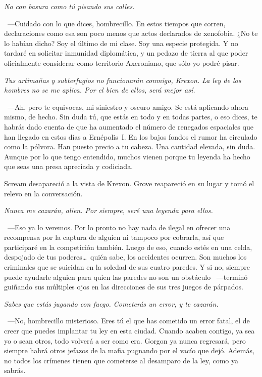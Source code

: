 \emph{No con basura como tú pisando sus calles.}

~---Cuidado con lo que dices, hombrecillo. En estos tiempos que corren, declaraciones como esa son poco menos que actos declarados de xenofobia. ¿No te lo habían dicho? Soy el último de mi clase. Soy una especie protegida. Y no tardaré en solicitar inmunidad diplomática, y un pedazo de tierra al que poder oficialmente considerar como territorio Axcroniano, que sólo yo podré pisar.

\emph{Tus artimañas y subterfugios no funcionarán conmigo, Krexon. La ley de los hombres no se me aplica. Por el bien de ellos, será mejor así.}

~---Ah, pero te equivocas, mi siniestro y oscuro amigo. Se está aplicando ahora mismo, de hecho. Sin duda tú, que estás en todo y en todas partes, o eso dices, te habrás dado cuenta de que ha aumentado el número de renegados espaciales que han llegado en estos días a Ernépolis~I. En los bajos fondos el rumor ha circulado como la pólvora. Han puesto precio a tu cabeza. Una cantidad elevada, sin duda. Aunque por lo que tengo entendido, muchos vienen porque tu leyenda ha hecho que seas una presa apreciada y codiciada.

Scream desapareció a la vista de Krexon. Grove reapareció en su lugar y tomó el relevo en la conversación.

\emph{Nunca me cazarán, alien. Por siempre, seré una leyenda para ellos.}

~---Eso ya lo veremos. Por lo pronto no hay nada de ilegal en ofrecer una recompensa por la captura de alguien ni tampoco por cobrarla, así que participaré en la competición también. Luego de eso, cuando estés en una celda, despojado de tus poderes\dots\ quién sabe, los accidentes ocurren. Son muchos los criminales que se suicidan en la soledad de sus cuatro paredes. Y si no, siempre puede ayudarle alguien para quien las paredes no son un obstáculo ~---­terminó guiñando sus múltiples ojos en las direcciones de sus tres juegos de párpados.

\emph{Sabes que estás jugando con fuego. Cometerás un error, y te cazarán.}

~---No, hombrecillo misterioso. Eres tú el que has cometido un error fatal, el de creer que puedes implantar tu ley en esta ciudad. Cuando acaben contigo, ya sea yo o sean otros, todo volverá a ser como era. Gorgon ya nunca regresará, pero siempre habrá otros jefazos de la mafia pugnando por el vacío que dejó. Además, no todos los crímenes tienen que cometerse al desamparo de la ley, como ya sabrás.

